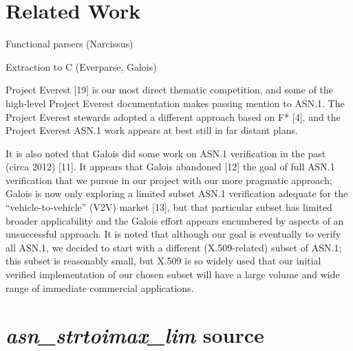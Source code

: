\documentclass[acmsmall,nonacm]{acmart}
\begin{document}
\section{Related Work}

  Functional parsers (Narcissus)

  Extraction to C (Everparse, Galois)

  Project Everest [19] is our most direct thematic competition, and some of the high-level Project Everest documentation makes passing mention to ASN.1. The Project Everest stewards adopted a different approach based on F* [4], and the Project Everest ASN.1 work  appears at best still in far distant plans.

It is also noted that Galois did some work on ASN.1 verification in the past (circa 2012) [11]. It appears that Galois abandoned [12] the goal of full ASN.1 verification that we pursue in our project with our more pragmatic approach; Galois is now only exploring a limited subset ASN.1 verification adequate for the “vehicle-to-vehicle” (V2V) market [13], but that particular subset has limited broader applicability and the Galois effort appears encumbered by aspects of an unsuccessful  approach. It is noted that although our goal is eventually to verify all ASN.1, we decided to start with a different (X.509-related) subset of ASN.1; this subset is reasonably small, but X.509 is so widely used that our initial verified implementation of our chosen subset will have a large volume and wide range of immediate commercial applications.


\appendix
\clearpage
\section{\emph{asn\_strtoimax\_lim} source}
\label{sec:stritomax}

{\fontsize{8}{4}\selectfont  }



\end{document}
